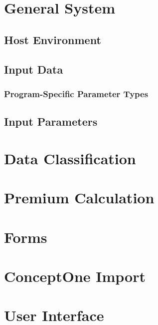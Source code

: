 


\pnumoff\part{General System}\pnumon

\chapter{Host Environment}
  

\chapter{Input Data}
    

    \section{Program-Specific Parameter Types}


\chapter{Input Parameters}
    



\pnumoff\part{Data Classification}\pnumon
  

\pnumoff\part{Premium Calculation}\pnumon
  

\pnumoff\part{Forms}\pnumon
  

\pnumoff\part{ConceptOne Import}\pnumon
  

\pnumoff\part{User Interface}\pnumon
  

